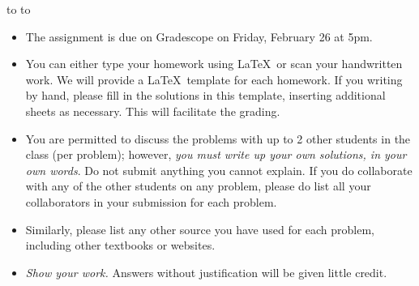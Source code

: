 \documentclass[10pt]{article}
\theoremstyle{definition}
\newcommand{\handout}{
   \renewcommand{\thepage}{H\hnumber-\arabic{page}}
   \noindent
   \begin{center}
      \vbox{
    \hbox to \columnwidth {\sc{\course} --- \prof \hfill}
    \vspace{-2mm}
    \hbox to \columnwidth {\sc due \MakeLowercase{\duedate} \duelocation\hfill {\Huge\color{mdb}H\hnumber.\yourname}}
      }
   \end{center}
   \vspace*{2mm}
}
\begin{document}
\handout
\begin{itemize}
\item The assignment is due on Gradescope on Friday, February 26 at 5pm. 

\item You can either type your homework using \LaTeX~or scan your handwritten work. We will provide a \LaTeX~template for each homework. If you writing by hand, please fill in the solutions in this template, inserting additional sheets as necessary. This will facilitate the grading.

\item You are permitted to discuss the problems with up to 2 other students in the class (per problem); however, {\em you must write up your own solutions, in your own words}. Do not submit anything you cannot explain. If you do collaborate with any of the other students on any problem, please do list all your collaborators in your submission for each problem. 

\item Similarly, please list any other source you have used for each problem, including other textbooks or websites.


\item {\em Show your work.} Answers without justification will be given little credit.
\end{itemize}
\end{document}
